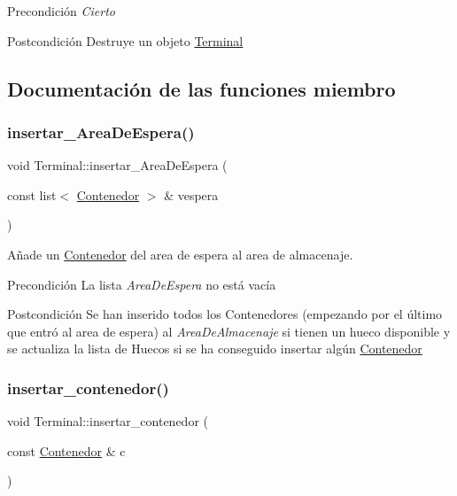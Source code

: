 \begin{DoxyPrecond}{Precondición}
{\itshape Cierto} 
\end{DoxyPrecond}
\begin{DoxyPostcond}{Postcondición}
Destruye un objeto \hyperlink{class_terminal}{Terminal} 
\end{DoxyPostcond}


\subsection{Documentación de las funciones miembro}
\mbox{\label{class_terminal_a7b12f84e1eeb3dacb6d73f6126bb13e1}} 
\subsubsection{\texorpdfstring{insertar\+\_\+\+Area\+De\+Espera()}{insertar\_AreaDeEspera()}}
{\footnotesize\ttfamily void Terminal\+::insertar\+\_\+\+Area\+De\+Espera (\begin{DoxyParamCaption}\item[{const list$<$ \hyperlink{class_contenedor}{Contenedor} $>$ \&}]{vespera }\end{DoxyParamCaption})}



Añade un \hyperlink{class_contenedor}{Contenedor} del area de espera al area de almacenaje. 

\begin{DoxyPrecond}{Precondición}
La lista {\itshape Area\+De\+Espera} no está vacía 
\end{DoxyPrecond}
\begin{DoxyPostcond}{Postcondición}
Se han inserido todos los Contenedores (empezando por el último que entró al area de espera) al {\itshape Area\+De\+Almacenaje} si tienen un hueco disponible y se actualiza la lista de Huecos si se ha conseguido insertar algún \hyperlink{class_contenedor}{Contenedor} 
\end{DoxyPostcond}
\mbox{\label{class_terminal_a0448a45cc3dea91ab383c79246c9e50e}} 
\subsubsection{\texorpdfstring{insertar\+\_\+contenedor()}{insertar\_contenedor()}}
{\footnotesize\ttfamily void Terminal\+::insertar\+\_\+contenedor (\begin{DoxyParamCaption}\item[{const \hyperlink{class_contenedor}{Contenedor} \&}]{c }\end{DoxyParamCaption})}



